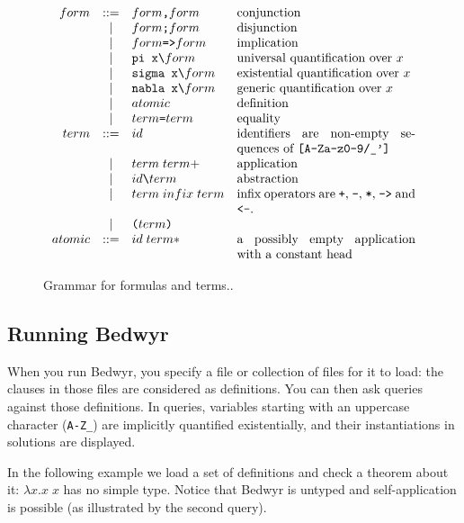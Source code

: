 \documentclass{article}
\begin{document}
\begin{figure}
\[\begin{array}{rclp{5cm}}
form &::=& form \texttt{,}  form & conjunction \\
     & | & form \texttt{;}  form & disjunction \\
     & | & form \texttt{=>} form & implication \\
     & | & \verb.pi x\.    form  & universal quantification over $x$ \\
     & | & \verb.sigma x\. form  & existential quantification over $x$ \\
     & | & \verb.nabla x\. form  & generic quantification over $x$ \\
     & | & atomic & definition \\
     & | & term \verb.=. term & equality \\
term &::=& id & identifiers are non-empty sequences of \verb.[A-Za-z0-9/_']. \\
     & | & term \; term+ & application \\
     & | & id \verb.\. term & abstraction \\
     & | & term \; infix \; term & infix operators are
             \verb.+., \verb.-., \verb.*., \verb.->. and \verb.<-.. \\
     & | & \verb.(. term \verb.). & \\
atomic &::=& id \; term* & a possibly empty application with a constant head \\
\end{array}\]
\caption{Grammar for formulas and terms..}
\label{concrete}
\end{figure}

\subsection{Running Bedwyr}

When you run Bedwyr, you specify a file or collection of files for it
to load: the clauses in those files are considered as definitions.  You
can then ask queries against those definitions.
In queries, variables starting with an uppercase character (\verb.A-Z_.)
are implicitly quantified existentially, and their instantiations in solutions
are displayed.

In the following example we load a set of definitions and check a
theorem about it: $\lambda x.x\;x$ has no simple type.  Notice that
Bedwyr is untyped and self-application is possible (as illustrated by
the second query).
\end{document}
